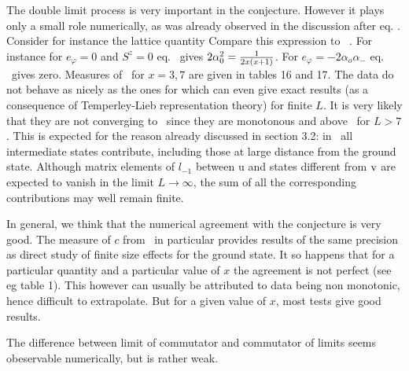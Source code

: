 

The  double limit process is very important in the conjecture.
However it plays only a small role numerically, as was already observed in the
discussion after eq. \test.  Consider for instance the lattice quantity
%
\eqn{}
%
Compare this expression to \numresi\ .
 For instance for $e_\varphi=0$ and $S^z=0$
eq. \numresi\ gives $2\alpha_0^2={1\over 2x(x+1)}$.
For $e_\varphi=-2\alpha_o\alpha_-$
eq. \numresi\ gives zero. Measures of \exi\ for
 $x=3,7$ are given in tables 16 and 17. The data
do not behave as nicely as the ones  for
\eqn{}
%
which can even give exact results (as a consequence of Temperley-Lieb
representation theory) for finite $L$. It is very likely  that they
are not converging to  \numresi\ since they are monotonous and above \numresi\
for $L>7$. This is expected for  the reason already discussed in section 3.2:
in \exi\ all
 intermediate states contribute, including
those at large distance from the ground state. Although matrix elements
 of $l_{-1}$ between u and states different from $\hbox{v}$
are expected to vanish in the limit $L\rightarrow\infty$, the sum of all
the corresponding
contributions may well remain finite.


In general, we think that the numerical agreement with the conjecture is very
 good.
The measure of $c$ from \tataix\ in particular provides results of the same
precision as direct study of finite size effects for the ground state. It so
happens
that for a particular quantity and a particular value of $x$ the agreement is
not perfect (see eg table 1).
This however can usually be attributed to data being non monotonic, hence
difficult to extrapolate. But for a given value of $x$, most tests give good
results.

The difference between limit of commutator and commutator of limits seems
obeservable  numerically, but is rather weak.



